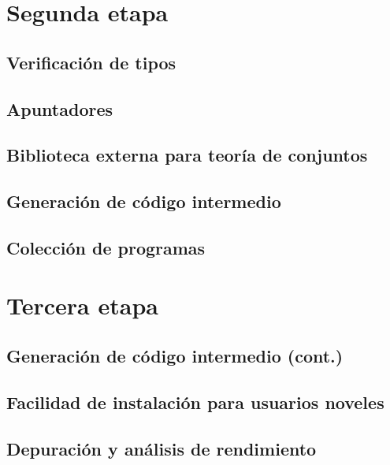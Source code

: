 \section{Segunda etapa}
\subsection{Verificación de tipos}
\blindtext[1]


\subsection{Apuntadores}
\blindtext[1]

\subsection{Biblioteca externa para teoría de conjuntos}
\blindtext[1]

\subsection{Generación de código intermedio}
\blindtext[1]

\subsection{Colección de programas}
\blindtext[1]

\section{Tercera etapa}
\subsection{Generación de código intermedio (cont.)}
\blindtext[1]

\subsection{Facilidad de instalación para usuarios noveles}
\blindtext[1]

\subsection{Depuración y análisis de rendimiento}
\blindtext[1]
